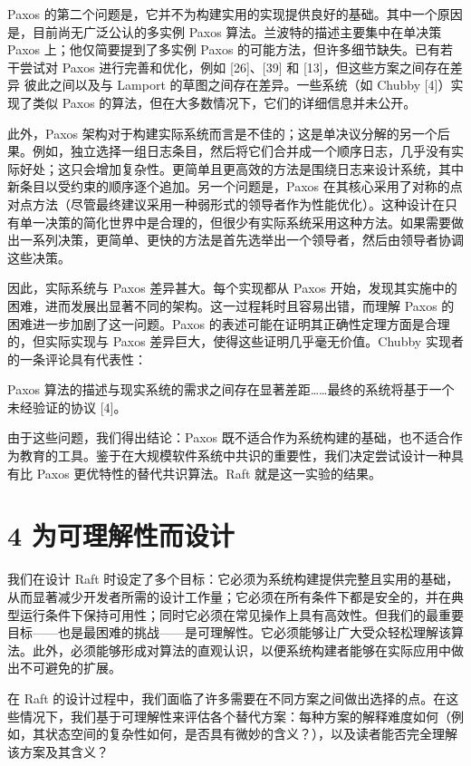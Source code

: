 \documentclass[12pt,a4paper]{report} %
\begin{document}
Paxos 的第二个问题是，它并不为构建实用的实现提供良好的基础。其中一个原因是，目前尚无广泛公认的多实例 Paxos 算法。兰波特的描述主要集中在单决策 Paxos 上；他仅简要提到了多实例 Paxos 的可能方法，但许多细节缺失。已有若干尝试对 Paxos 进行完善和优化，例如 [26]、[39] 和 [13]，但这些方案之间存在差异
彼此之间以及与 Lamport 的草图之间存在差异。一些系统（如 Chubby [4]）实现了类似 Paxos 的算法，但在大多数情况下，它们的详细信息并未公开。

此外，Paxos 架构对于构建实际系统而言是不佳的；这是单决议分解的另一个后果。例如，独立选择一组日志条目，然后将它们合并成一个顺序日志，几乎没有实际好处；这只会增加复杂性。更简单且更高效的方法是围绕日志来设计系统，其中新条目以受约束的顺序逐个追加。另一个问题是，Paxos 在其核心采用了对称的点对点方法（尽管最终建议采用一种弱形式的领导者作为性能优化）。这种设计在只有单一决策的简化世界中是合理的，但很少有实际系统采用这种方法。如果需要做出一系列决策，更简单、更快的方法是首先选举出一个领导者，然后由领导者协调这些决策。

因此，实际系统与 Paxos 差异甚大。每个实现都从 Paxos 开始，发现其实施中的困难，进而发展出显著不同的架构。这一过程耗时且容易出错，而理解 Paxos 的困难进一步加剧了这一问题。Paxos 的表述可能在证明其正确性定理方面是合理的，但实际实现与 Paxos 差异巨大，使得这些证明几乎毫无价值。Chubby 实现者的一条评论具有代表性：

Paxos 算法的描述与现实系统的需求之间存在显著差距……最终的系统将基于一个未经验证的协议 [4]。

由于这些问题，我们得出结论：Paxos 既不适合作为系统构建的基础，也不适合作为教育的工具。鉴于在大规模软件系统中共识的重要性，我们决定尝试设计一种具有比 Paxos 更优特性的替代共识算法。Raft 就是这一实验的结果。

\section*{4 为可理解性而设计}

我们在设计 Raft 时设定了多个目标：它必须为系统构建提供完整且实用的基础，从而显著减少开发者所需的设计工作量；它必须在所有条件下都是安全的，并在典型运行条件下保持可用性；同时它必须在常见操作上具有高效性。但我们的最重要目标——也是最困难的挑战——是可理解性。它必须能够让广大受众轻松理解该算法。此外，必须能够形成对算法的直观认识，以便系统构建者能够在实际应用中做出不可避免的扩展。

在 Raft 的设计过程中，我们面临了许多需要在不同方案之间做出选择的点。在这些情况下，我们基于可理解性来评估各个替代方案：每种方案的解释难度如何（例如，其状态空间的复杂性如何，是否具有微妙的含义？），以及读者能否完全理解该方案及其含义？
\end{document}
